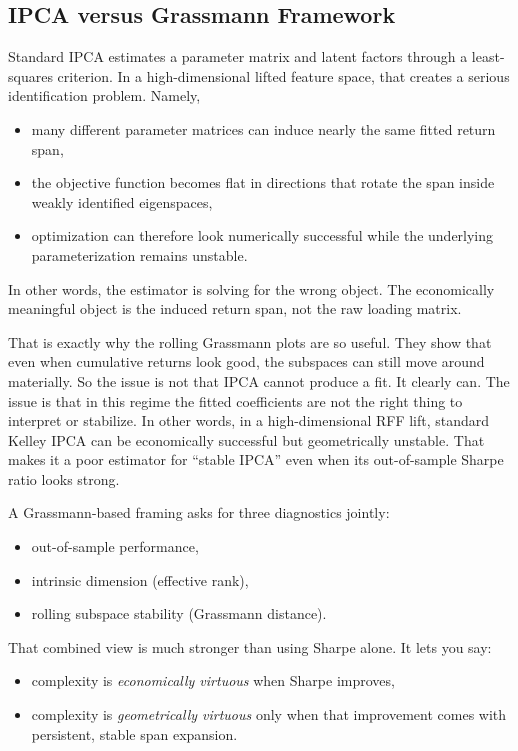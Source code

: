 \documentclass[twoside,11pt,letter]{article}
\begin{document}
\subsection{IPCA versus Grassmann Framework}

Standard IPCA estimates a parameter matrix and latent factors through a least-squares criterion. In a high-dimensional lifted feature space, that creates a serious identification problem. Namely,
\begin{itemize}
\item[(i)] many different parameter matrices can induce nearly the same fitted return span,
\item[(ii)] the objective function becomes flat in directions that rotate the span inside weakly identified eigenspaces,
\item[(iii)] optimization can therefore look numerically successful while the underlying parameterization remains unstable.
\end{itemize}
In other words, the estimator is solving for the wrong object. The economically meaningful object is the induced return span, not the raw loading matrix.

That is exactly why the rolling Grassmann plots are so useful. They show that even when cumulative returns look good, the subspaces can still move around materially. So the issue is not that IPCA cannot produce a fit. It clearly can. The issue is that in this regime the fitted coefficients are not the right thing to interpret or stabilize. In other words, in a high-dimensional RFF lift, standard Kelley IPCA can be economically successful but geometrically unstable.
That makes it a poor estimator for ``stable IPCA'' even when its out-of-sample Sharpe ratio looks strong.
		
A Grassmann-based framing asks for three diagnostics jointly:
\begin{itemize}
\item[(i)] out-of-sample performance,
\item[(ii)] intrinsic dimension (effective rank),
\item[(iii)] rolling subspace stability (Grassmann distance).
\end{itemize}
That combined view is much stronger than using Sharpe alone. It lets you say:
\begin{itemize}
\item[(i)] complexity is \textit{economically virtuous} when Sharpe improves,
\item[(ii)] complexity is \textit{geometrically virtuous} only when that improvement comes with persistent, stable span expansion.
\end{itemize}
\end{document}
